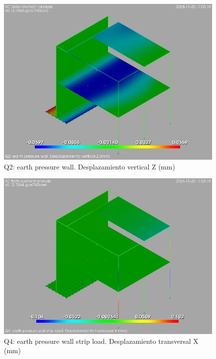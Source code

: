 \begin{figure}[ht]
\begin{center}
\includegraphics[width=\linewidth]{results/graphics/resSimplLC/QearthPressWalluZ.png}
\caption{Q2: earth pressure wall. Desplazamiento vertical Z (mm)}
\label{QearthPressWalluZ}
\end{center}
\end{figure}
\begin{figure}[ht]
\begin{center}
\includegraphics[width=\linewidth]{results/graphics/resSimplLC/QearthPWallStrLuX.png}
\caption{Q4: earth pressure wall strip load. Desplazamiento transversal X (mm)}
\label{QearthPWallStrLuX}
\end{center}
\end{figure}
